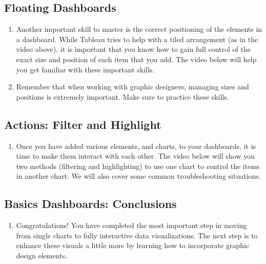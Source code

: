 \documentclass[
]{book}
\providecommand{\tightlist}{%
  \setlength{\itemsep}{0pt}\setlength{\parskip}{0pt}}
\begin{document}
\hypertarget{floating-dashboards}{%
\subsection{Floating Dashboards}\label{floating-dashboards}}

\begin{enumerate}
\def\labelenumi{\arabic{enumi}.}
\tightlist
\item
  Another important skill to master is the correct positioning of the elements in a dashboard. While Tableau tries to help with a tiled arrangement (as in the video above), it is important that you know how to gain full control of the exact size and position of each item that you add. The video below will help you get familiar with these important skills.
\item
  Remember that when working with graphic designers, managing sizes and positions is extremely important. Make sure to practice these skills.
\end{enumerate}

\hypertarget{actions-filter-and-highlight}{%
\subsection{Actions: Filter and Highlight}\label{actions-filter-and-highlight}}

\begin{enumerate}
\def\labelenumi{\arabic{enumi}.}
\tightlist
\item
  Once you have added various elements, and charts, to your dashboards, it is time to make them interact with each other. The video below will show you two methods (filtering and highlighting) to use one chart to control the items in another chart. We will also cover some common troubleshooting situations.
\end{enumerate}

\hypertarget{basics-dashboards-conclusions}{%
\subsection{Basics Dashboards: Conclusions}\label{basics-dashboards-conclusions}}

\begin{enumerate}
\def\labelenumi{\arabic{enumi}.}
\tightlist
\item
  Congratulations! You have completed the most important step in moving from single charts to fully interactive data visualizations. The next step is to enhance these visuals a little more by learning how to incorporate graphic design elements.
\end{enumerate}
\end{document}

